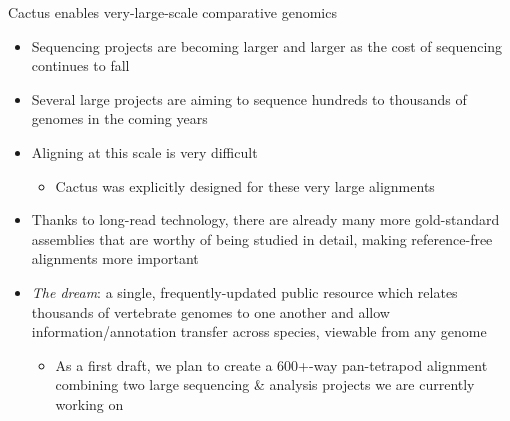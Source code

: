 \documentclass[10pt,
               hyperref={bookmarks=false,
                         bookmarksopen=false,
                         colorlinks=true,
                         linkcolor=blue,
                         urlcolor=blue},
               xcolor={svgnames,table}]{beamer}
\newenvironment{tightitemize}{%
\begin{itemize}
  \setlength{\itemsep}{1pt}%
  \setlength{\parskip}{0pt}%
  \setlength{\parsep}{0pt}%
}{\end{itemize}}
\begin{document}
\begin{frame}{Cactus enables very-large-scale comparative genomics}
    \begin{itemize}
        \item Sequencing projects are becoming larger and larger as the cost of sequencing continues to fall
        \item Several large projects are aiming to sequence hundreds to thousands of genomes in the coming years
        \item Aligning at this scale is very difficult
          \begin{tightitemize}
          \item Cactus was explicitly designed for these very large alignments
          \end{tightitemize}
        \item Thanks to long-read technology, there are already many more gold-standard assemblies that are worthy of being studied in detail, making reference-free alignments more important
        \item \emph{The dream}: a single, frequently-updated public resource which relates thousands of vertebrate genomes to one another and allow information/annotation transfer across species, viewable from any genome
          \begin{tightitemize}
            \item As a first draft, we plan to create a 600+-way pan-tetrapod alignment combining two large sequencing \& analysis projects we are currently working on
        \end{tightitemize}
    \end{itemize}
\end{frame}
\end{document}
